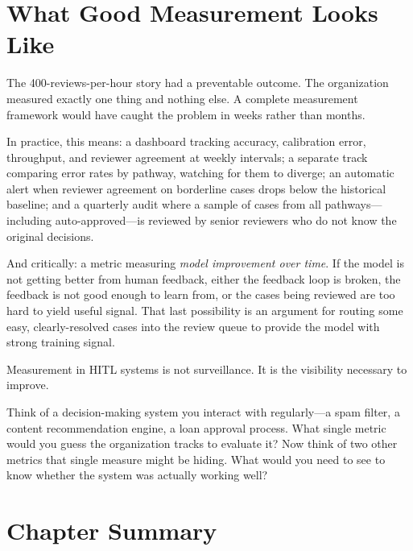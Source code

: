 \section{What Good Measurement Looks Like}

The 400-reviews-per-hour story had a preventable outcome. The organization measured exactly one thing and nothing else. A complete measurement framework would have caught the problem in weeks rather than months.

In practice, this means: a dashboard tracking accuracy, calibration error, throughput, and reviewer agreement at weekly intervals; a separate track comparing error rates by pathway, watching for them to diverge; an automatic alert when reviewer agreement on borderline cases drops below the historical baseline; and a quarterly audit where a sample of cases from all pathways---including auto-approved---is reviewed by senior reviewers who do not know the original decisions.

And critically: a metric measuring \emph{model improvement over time}. If the model is not getting better from human feedback, either the feedback loop is broken, the feedback is not good enough to learn from, or the cases being reviewed are too hard to yield useful signal. That last possibility is an argument for routing some easy, clearly-resolved cases into the review queue to provide the model with strong training signal.

Measurement in HITL systems is not surveillance. It is the visibility necessary to improve.

\bigskip

\begin{trythis}
Think of a decision-making system you interact with regularly---a spam filter, a content recommendation engine, a loan approval process. What single metric would you guess the organization tracks to evaluate it? Now think of two other metrics that single measure might be hiding. What would you need to see to know whether the system was actually working well?
\end{trythis}

\section*{Chapter Summary}

